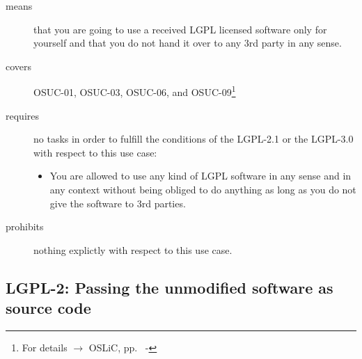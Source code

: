 \begin{description}

\item[means] that you are going to use a received LGPL licensed software only
for yourself and that you do not hand it over to any 3rd party in any sense.

\item[covers] OSUC-01, OSUC-03, OSUC-06, and OSUC-09\footnote{For details
$\rightarrow$ OSLiC, pp.\ \pageref{OSUC-01-DEF} - \pageref{OSUC-09-DEF}}

\item[requires] no tasks in order to fulfill the conditions of the LGPL-2.1 or
the LGPL-3.0 with respect to this use case:
  \begin{itemize}
    \item You are allowed to use any kind of LGPL software in any sense and in
    any context without being obliged to do anything as long as you do not
    give the software to 3rd parties.
  \end{itemize}

\item[prohibits] nothing explictly with respect to this use case.
\end{description}


\subsection{LGPL-2: Passing the unmodified software as source code}
\label{OSUC-02-LGPL} \label{OSUC-05-LGPL} \label{OSUC-07-LGPL} 


